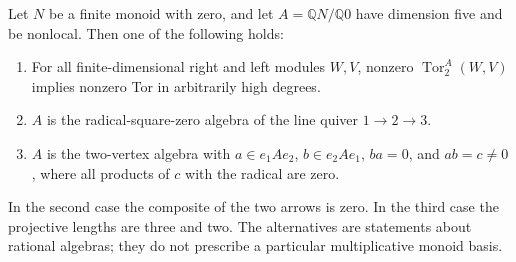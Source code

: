 \begin{proposition}
\label{B:five-nonlocal-exceptions}
Let $N$ be a finite monoid with zero, and let
$A=\mathbb QN/\mathbb Q0$ have dimension five and be nonlocal.
Then one of the following holds:
\begin{enumerate}
\item For all finite-dimensional right and left modules $W,V$,
nonzero $\operatorname{Tor}_2^A(W,V)$ implies nonzero Tor in
arbitrarily high degrees.
\item $A$ is the radical-square-zero algebra of the line quiver
$1\longrightarrow2\longrightarrow3$.
\item $A$ is the two-vertex algebra with
$a\in e_1Ae_2$, $b\in e_2Ae_1$, $ba=0$, and $ab=c\ne0$,
where all products of $c$ with the radical are zero.
\end{enumerate}
In the second case the composite of the two arrows is zero.
In the third case the projective lengths are three and two.
The alternatives are statements about rational algebras; they do
not prescribe a particular multiplicative monoid basis.
\end{proposition}

